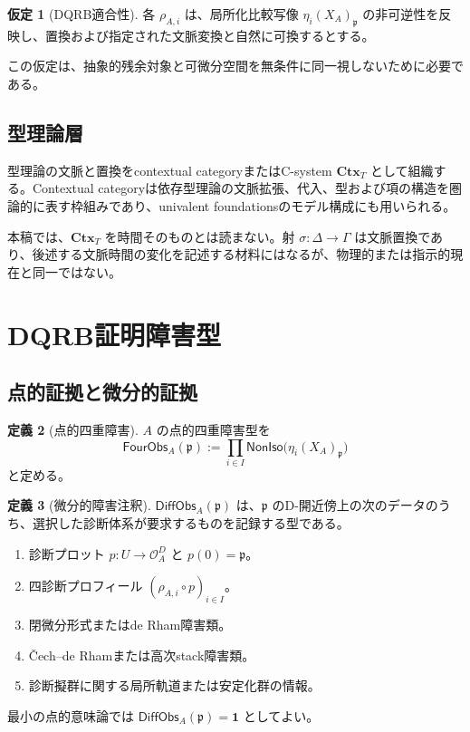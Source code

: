 \documentclass[a4paper,11pt]{ltjsarticle}
\theoremstyle{definition}
\newtheorem{definition}{定義}[section]
\newtheorem{assumption}[definition]{仮定}
\theoremstyle{plain}
\newcommand{\Ctx}{\mathbf{Ctx}}
\newcommand{\Unit}{\mathbf 1}
\begin{document}
\begin{assumption}[DQRB適合性]
各 $\rho_{A,i}$ は、局所化比較写像 $\eta_i(X_A)_{\mathfrak p}$ の非可逆性を反映し、置換および指定された文脈変換と自然に可換するとする。
\end{assumption}

この仮定は、抽象的残余対象と可微分空間を無条件に同一視しないために必要である。

\subsection{型理論層}

型理論の文脈と置換をcontextual categoryまたはC-system $\Ctx_T$ として組織する。Contextual categoryは依存型理論の文脈拡張、代入、型および項の構造を圏論的に表す枠組みであり、univalent foundationsのモデル構成にも用いられる\cite{Voevodsky2015CSystem,KapulkinLumsdaine2021,AhrensLumsdaineVoevodsky2018}。

本稿では、$\Ctx_T$ を時間そのものとは読まない。射 $\sigma:\Delta\to\Gamma$ は文脈置換であり、後述する文脈時間の変化を記述する材料にはなるが、物理的または指示的現在と同一ではない。

\section{DQRB証明障害型}

\subsection{点的証拠と微分的証拠}

\begin{definition}[点的四重障害]
$A$ の点的四重障害型を
\begin{equation}
 \mathsf{FourObs}_A(\mathfrak p)
 :=
 \prod_{i\in I}
 \mathsf{NonIso}
 \bigl(\eta_i(X_A)_{\mathfrak p}\bigr)
 \label{eq:four-obstruction}
\end{equation}
と定める。
\end{definition}

\begin{definition}[微分的障害注釈]
$\mathsf{DiffObs}_A(\mathfrak p)$ は、$\mathfrak p$ のD-開近傍上の次のデータのうち、選択した診断体系が要求するものを記録する型である。
\begin{enumerate}
 \item 診断プロット $p:U\to\mathcal O_A^D$ と $p(0)=\mathfrak p$。
 \item 四診断プロフィール $(\rho_{A,i}\circ p)_{i\in I}$。
 \item 閉微分形式またはde Rham障害類。
 \item \v{C}ech--de Rhamまたは高次stack障害類。
 \item 診断擬群に関する局所軌道または安定化群の情報。
\end{enumerate}
最小の点的意味論では $\mathsf{DiffObs}_A(\mathfrak p)=\Unit$ としてよい。
\end{definition}
\end{document}
